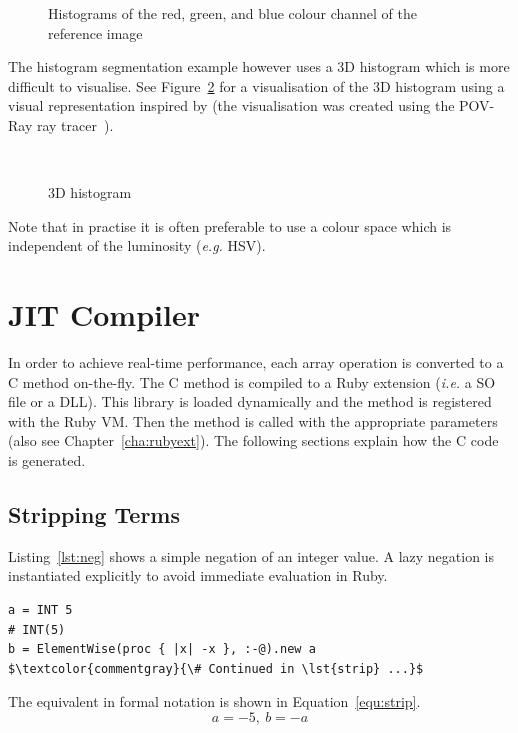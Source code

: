 \documentclass[12pt,a4paper,oneside,openright]{book}
\newcommand{\eg}{\emph{e.g.} }
\newcommand{\ie}{\emph{i.e.} }
\newcommand{\cha}[1]{Chapter~\ref{cha:#1}}
\newcommand{\equ}[1]{Equation~\ref{equ:#1}}
\newcommand{\fig}[1]{Figure~\ref{fig:#1}}
\newcommand{\lst}[1]{Listing~\ref{lst:#1}}
\begin{document}
\begin{CJK}{UTF8}{}
\begin{figure}[htbp]
\begin{center}
    \caption{Histograms of the red, green, and blue colour channel of the reference image\label{fig:hist}}
  \end{center}
\end{figure}
The histogram segmentation example however uses a \ac{3D} histogram which is more difficult to visualise. See \fig{hist3d} for a visualisation of the \ac{3D} histogram using a visual representation inspired by \citet{hist3d} (the visualisation was created using the POV-Ray ray tracer~\citep{RefWorks:51}).
\begin{figure}[htbp]
   \begin{center}
     \\
     \caption{\acs{3D} histogram\label{fig:hist3d}}
   \end{center}
\end{figure}
Note that in practise it is often preferable to use a colour space which is independent of the luminosity (\eg \ac{HSV}).
  
\section{\acs{JIT} Compiler}\label{cha:jitcomp}
In order to achieve real-time performance, each array operation is converted to a C method on-the-fly. The C method is compiled to a Ruby extension (\ie a \ac{SO} file or a \ac{DLL}). This library is loaded dynamically and the method is registered with the Ruby \ac{VM}. Then the method is called with the appropriate parameters (also see \cha{rubyext}). The following sections explain how the C code is generated.

\subsection{Stripping Terms}
\lst{neg} shows a simple negation of an integer value. A lazy negation is instantiated explicitly to avoid immediate evaluation in Ruby.
\lstset{language=Ruby,frame=single,numbers=left}
\begin{lstlisting}[float,caption={Lazy negation of integer},escapechar=\$,label=lst:neg,name=gcc]
a = INT 5
# INT(5)
b = ElementWise(proc { |x| -x }, :-@).new a
$\textcolor{commentgray}{\# Continued in \lst{strip} ...}$
\end{lstlisting}
The equivalent in formal notation is shown in \equ{strip}.
\begin{equation}\label{equ:strip}
  a=-5\mathrm{,\ }b=-a
\end{equation}


\end{CJK}
\end{document}
